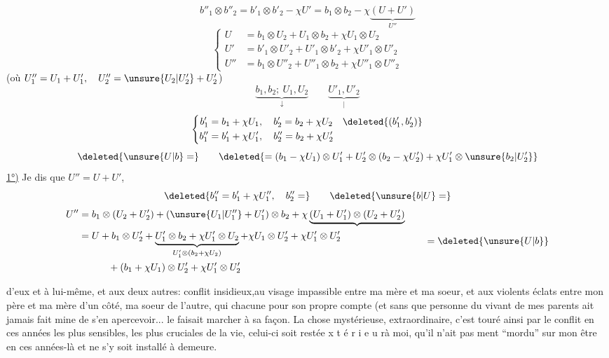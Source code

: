 \[
b''_1\otimes b''_2=b'_1\otimes b'_2-\chi U'
=b_1\otimes b_2-\chi\underbrace{(U+U')}_{U''}
\]
\[
\left\{\begin{aligned}
U&=b_1\otimes U_2+U_1\otimes b_2+\chi U_1\otimes U_2\\
U'&=b'_1\otimes U'_2+U'_1\otimes b'_2+\chi U'_1\otimes U'_2\\
U''&=b_1\otimes U''_2+U''_1\otimes b_2+\chi U''_1\otimes U''_2
\end{aligned}\right.
\]
(où \(U''_1=U_1+U'_1,\quad U''_2=\unsure{U_2|U'_2}+U'_2\))
\[
\underbrace{b_1,b_2;\ U_1,U_2}_{\downarrow}\qquad
\underbrace{U'_1,U'_2}_{|}
\]
\[
\left\{\begin{aligned}
b'_1&=b_1+\chi U_1,\quad b'_2=b_2+\chi U_2\quad\deleted{(b'_1,b'_2)}\\
b''_1&=b'_1+\chi U'_1,\quad b''_2=b_2+\chi U'_2
\end{aligned}\right.
\]
\[
\deleted{\unsure{U|b}=}\qquad
\deleted{=(b_1-\chi U_1)\otimes U'_1+U'_2\otimes(b_2-\chi U'_2)+\chi U'_1\otimes\unsure{b_2|U'_2}}
\]
\uline{1°)} Je dis que \(U''=U+U'\),
\[
\deleted{b''_1=b'_1+\chi U''_1,\quad b''_2=}\qquad\deleted{\unsure{b|U}=}
\]
\[
\begin{aligned}
U''&=b_1\otimes(U_2+U'_2)+(\unsure{U_1|U''_1}+U'_1)\otimes b_2
+\chi\underbrace{(U_1+U'_1)\otimes(U_2+U'_2)}\\
&=U+b_1\otimes U'_2+\underbrace{U'_1\otimes b_2+\chi U'_1\otimes U_2}_{U'_1\otimes(b_2+\chi U_2)}
+\chi U_1\otimes U'_2+\chi U'_1\otimes U'_2\\
&\hspace{3em}{}+(b_1+\chi U_1)\otimes U'_2+\chi U'_1\otimes U'_2
\end{aligned}
\qquad=\deleted{\unsure{U|b}}
\]

d'eux et à lui-même, et aux deux autres: conflit insidieux,au visage impassible
entre ma mère et ma soeur, et  aux violents éclats entre mon père et ma
mère d'un côté, ma soeur de l'autre, qui chacune pour son propre compte (et sans
que personne du vivant de mes parents ait jamais fait mine de s'en apercevoir...
le faisait marcher à sa façon. La chose mystérieuse, extraordinaire, c'est \newline
touré ainsi par le conflit en ces années les plus sensibles, les plus cruciales
de la vie, celui-ci soit resté\quad e x t é r i e u r\quad à moi, qu'il n'ait pas \newline
ment ``mordu'' sur mon être en ces années-là et ne s'y soit installé à demeure.

